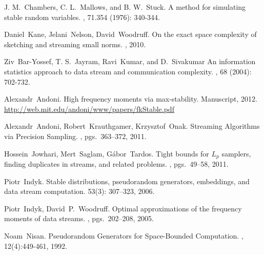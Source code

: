 \documentclass[11pt]{article}
\begin{document}


\begin{thebibliography}{42}

J. M.~Chambers, C. L.~Mallows, and B. W.~Stuck.
\newblock A method for simulating stable random variables.
, 71.354 (1976): 340-344.

Daniel~Kane, Jelani~Nelson, David~Woodruff.
\newblock On the exact space complexity of sketching and streaming small norms.
, 2010.

Ziv~Bar-Yossef, T. S.~Jayram, Ravi~Kumar, and D.~Sivakumar
\newblock An information statistics approach to data stream and communication complexity.
, 68 (2004): 702-732.

Alexandr~Andoni.
\newblock High frequency moments via max-stability. 
\newblock Manuscript, 2012. \url{http://web.mit.edu/andoni/www/papers/fkStable.pdf}

Alexandr~Andoni, Robert~Krauthgamer, Krzysztof~Onak.
\newblock Streaming Algorithms via Precision Sampling.
, pgs.\ 363--372, 2011.

Hossein~Jowhari, Mert~Saglam, G\'{a}bor~Tardos.
\newblock Tight bounds for $L_p$ samplers, finding duplicates in streams, and related problems.
, pgs.\ 49--58, 2011.

Piotr~Indyk.
\newblock Stable distributions, pseudorandom generators, embeddings, and data stream computation.
 53(3): 307--323, 2006.

Piotr~Indyk, David~P.~Woodruff.
\newblock Optimal approximations of the frequency moments of data streams. 
, pgs.\ 202--208, 2005.

Noam~Nisan.
\newblock Pseudorandom Generators for Space-Bounded Computation.
, 12(4):449-461, 1992.

\end{thebibliography}
\end{document}
